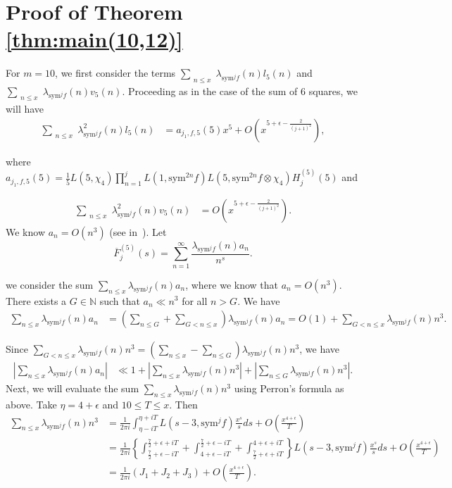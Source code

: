 \documentclass[10pt]{amsart}
\begin{document}
\section{Proof of Theorem \ref{thm:main(10,12)}} \label{sec:main(10,12)}

For $m=10$, we first consider the terms $\sum_{\substack{n\leq x}}\lambda_{\mathrm{sym}^jf}(n)l_5(n)$ and $\sum_{\substack{n\leq x}}\lambda_{\mathrm{sym}^jf}(n)v_5(n)$. Proceeding as in the case of the sum of $6$ squares, we will have \begin{align}
    \sum_{\substack{n\leq x}}\lambda_{\mathrm{sym}^jf}^2(n)l_5(n) &= a_{j_1,f,5}(5)x^5 + O\left( x^{5+\epsilon-\frac{2}{(j+1)^2}} \right),
\end{align}

where $a_{j_1,f,5}(5) = \frac{1}{5}L(5,\chi_4)\prod_{n=1}^{j}L(1,\mathrm{sym}^{2n} f)L(5,\mathrm{sym}^{2n}f\otimes\chi_4)H_{j}^{(5)}(5)$ and 

\begin{align}
    \sum_{\substack{n\leq x}}\lambda_{\mathrm{sym}^jf}^2(n)v_5(n) &= O\left( x^{5+\epsilon-\frac{2}{(j+1)^2}} \right).
\end{align}
We know $a_n = O(n^3)$ (see in~\cite{Grosswald}). Let $$\overline{F}_{j}^{(5)}(s) = \sum_{n=1}^{\infty}\frac{\lambda_{\mathrm{sym}^jf}(n)a_n}{n^s}.$$

we consider the sum $\sum_{n \leq x} \lambda_{\mathrm{sym}^j f}(n)a_n$, where we know that $a_n = O(n^3).$ There exists a $G \in \mathbb{N}$ such that $a_n \ll n^3$ for all $n > G$. We have 
\begin{align*}
    \sum_{n \leq x} \lambda_{\mathrm{sym}^j f}(n)a_n &= \left( \sum_{n \leq G} + \sum_{G < n \leq x} \right) \lambda_{\mathrm{sym}^j f}(n)a_n = O(1) + \sum_{G < n \leq x}\lambda_{\mathrm{sym}^j f}(n)n^3 .
\end{align*} 

Since $\sum_{G <n \leq x} \lambda_{\mathrm{sym}^j f}(n)n^3 = \left( \sum_{n \leq x} - \sum_{n \leq G} \right)\lambda_{\mathrm{sym}^j f}(n)n^3$, we have
\begin{align*}
    |\sum_{n \leq x}\lambda_{\mathrm{sym}^j f}(n)a_n| &\ll 1 + |\sum_{n\leq x}\lambda_{\mathrm{sym}^j f}(n)n^3| +|\sum_{n\leq G}\lambda_{\mathrm{sym}^j f}(n)n^3|.
\end{align*}
Next, we will evaluate the sum $\sum_{n\leq x}\lambda_{\mathrm{sym}^j f}(n)n^3$ using Perron's formula as above. Take $\eta = 4+\epsilon$ and $10 \leq T \leq x$. Then \begin{align*}
    \sum_{n\leq x}\lambda_{\mathrm{sym}^j f}(n)n^3 &= \frac{1}{2 \pi i}\int_{\eta - iT}^{\eta +iT}L(s-3, \mathrm{sym}^j f)\frac{x^s}{s}ds + O\left(\frac{x^{4+\epsilon}}{T}\right)\\
    &= \frac{1}{2 \pi i}\left\{ \int_{\frac{7}{2}+\epsilon-iT}^{\frac{7}{2}+\epsilon+iT} + \int_{4+\epsilon -iT}^{\frac{7}{2}+\epsilon-iT} + \int_{\frac{7}{2}+\epsilon+iT}^{4+\epsilon +iT}\right\}L(s-3, \mathrm{sym}^j f)\frac{x^s}{s}ds + O\left(\frac{x^{4+\epsilon}}{T}\right)\\
    &= \frac{1}{2 \pi i} \left( J_1+J_2+J_3 \right) + O\left(\frac{x^{4+\epsilon}}{T}\right).
\end{align*} 
\end{document}
